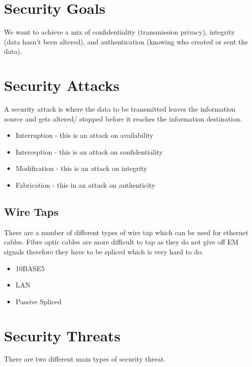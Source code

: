 
\section*{Security Goals}
We want to achieve a mix of confidentiality (transmission privacy), integrity (data hasn't been altered), and authentication (knowing who created or sent the data).

\section*{Security Attacks}
A security attack is where the data to be transmitted leaves the information source and gets altered/ stopped before it reaches the information destination.
\begin{itemize}
    \item Interruption - this is an attack on availability
    \item Interception - this is an attack on confidentiality
    \item Modification - this is an attack on integrity
    \item Fabrication - this in an attack on authenticity
\end{itemize}

\subsection*{Wire Taps}
There are a number of different types of wire tap which can be used for ethernet cables. Fibre optic cables are more difficult to tap as they do not give off EM signals therefore they have to be spliced which is very hard to do.
\begin{itemize}
    \item 10BASE5
    \item LAN
    \item Passive Spliced
\end{itemize}

\section*{Security Threats}
There are two different main types of security threat.
